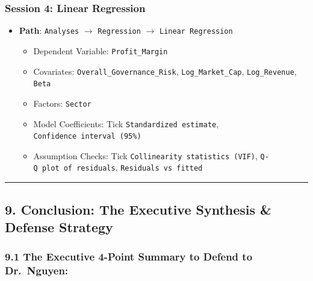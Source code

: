 \documentclass[
]{article}
\providecommand{\tightlist}{%
  \setlength{\itemsep}{0pt}\setlength{\parskip}{0pt}}
\begin{document}
\subsubsection{Session 4: Linear
Regression}\label{session-4-linear-regression}

\begin{itemize}
\tightlist
\item
  \textbf{Path}: \texttt{Analyses} \(\rightarrow\) \texttt{Regression}
  \(\rightarrow\) \texttt{Linear\ Regression}

  \begin{itemize}
  \tightlist
  \item
    Dependent Variable: \texttt{Profit\_Margin}
  \item
    Covariates: \texttt{Overall\_Governance\_Risk},
    \texttt{Log\_Market\_Cap}, \texttt{Log\_Revenue}, \texttt{Beta}
  \item
    Factors: \texttt{Sector}
  \item
    Model Coefficients: Tick \texttt{Standardized\ estimate},
    \texttt{Confidence\ interval\ (95\%)}
  \item
    Assumption Checks: Tick \texttt{Collinearity\ statistics\ (VIF)},
    \texttt{Q-Q\ plot\ of\ residuals}, \texttt{Residuals\ vs\ fitted}
  \end{itemize}
\end{itemize}

\begin{center}\rule{0.5\linewidth}{0.5pt}\end{center}

\subsection{9. Conclusion: The Executive Synthesis \& Defense
Strategy}\label{conclusion-the-executive-synthesis-defense-strategy}

\subsubsection{9.1 The Executive 4-Point Summary to Defend to
Dr.~Nguyen:}\label{the-executive-4-point-summary-to-defend-to-dr.-nguyen}
\end{document}
